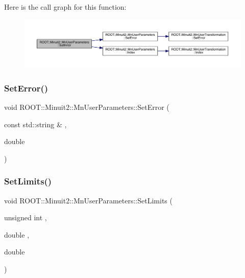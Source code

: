 Here is the call graph for this function\+:\nopagebreak
\begin{figure}[H]
\begin{center}
\leavevmode
\includegraphics[width=350pt]{d6/d10/classROOT_1_1Minuit2_1_1MnUserParameters_aa3d8a9df23458438ccff06800d7c9af2_cgraph}
\end{center}
\end{figure}
\mbox{\label{classROOT_1_1Minuit2_1_1MnUserParameters_aa3d8a9df23458438ccff06800d7c9af2}} 
\subsubsection{\texorpdfstring{SetError()}{SetError()}\hspace{0.1cm}{\footnotesize\ttfamily [4/4]}}
{\footnotesize\ttfamily void R\+O\+O\+T\+::\+Minuit2\+::\+Mn\+User\+Parameters\+::\+Set\+Error (\begin{DoxyParamCaption}\item[{const std\+::string \&}]{,  }\item[{double}]{ }\end{DoxyParamCaption})}

\mbox{\label{classROOT_1_1Minuit2_1_1MnUserParameters_afa56296f97716c90cfbdd3f81d5caffc}} 
\subsubsection{\texorpdfstring{SetLimits()}{SetLimits()}\hspace{0.1cm}{\footnotesize\ttfamily [1/4]}}
{\footnotesize\ttfamily void R\+O\+O\+T\+::\+Minuit2\+::\+Mn\+User\+Parameters\+::\+Set\+Limits (\begin{DoxyParamCaption}\item[{unsigned int}]{,  }\item[{double}]{,  }\item[{double}]{ }\end{DoxyParamCaption})}

